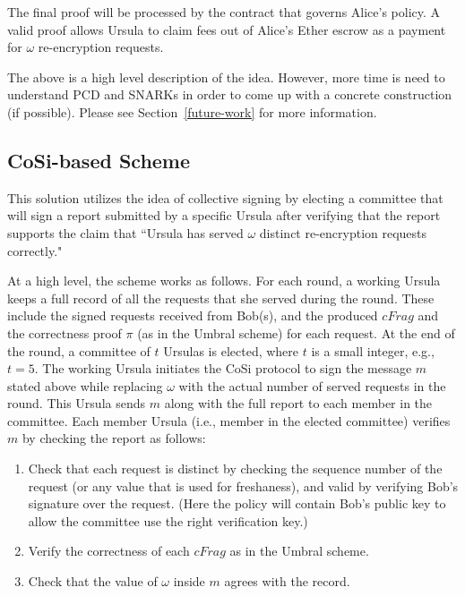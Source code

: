 The final proof will be processed by the contract that governs Alice's policy. A valid proof allows Ursula to claim fees out of Alice's Ether escrow as a payment for $\omega$ re-encryption  requests. 


The above is a high level description of the idea. However, more time is need to understand PCD and SNARKs in order to come up with a concrete construction (if possible). Please see Section~\ref{future-work} for more information.


\subsection{CoSi-based Scheme}
This solution utilizes the idea of collective signing by electing a committee that will sign a report submitted by a specific Ursula after verifying that the report supports the claim that ``Ursula has served $\omega$ distinct re-encryption requests correctly." 


At a high level, the scheme works as follows. For each round, a working Ursula keeps a full record of all the requests that she served during the round. These include the signed requests received from Bob(s), and the produced $cFrag$ and the correctness proof $\pi$ (as in the Umbral scheme) for each request. At the end of the round, a committee of $t$ Ursulas is elected, where $t$ is a small integer, e.g., $t = 5$. The working Ursula 
initiates the CoSi protocol to sign the message $m$ stated above while replacing $\omega$ with the actual number of served requests in the round. This Ursula sends $m$ along with the full report to each member in the committee. Each member Ursula (i.e., member in the elected committee) verifies $m$ by checking the report as follows:
\begin{enumerate}
\setlength{\itemsep}{0pt}
\item Check that each request is distinct by checking the sequence number of the request (or any value that is used for freshaness), and valid by verifying Bob's signature over the request. (Here the policy will contain Bob's public key to allow the committee use the right verification key.)


\item Verify the correctness of each $cFrag$ as in the Umbral scheme.

\item Check that the value of $\omega$ inside $m$ agrees with the record.
\end{enumerate}


